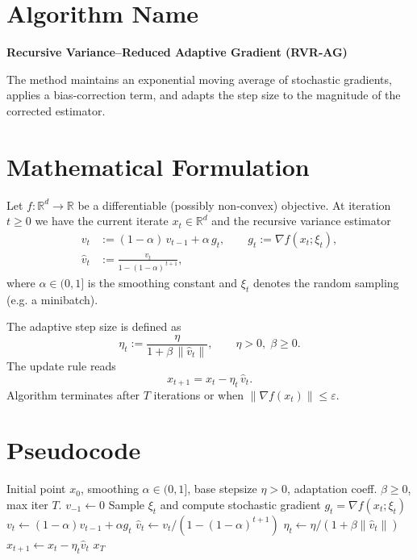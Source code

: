 \documentclass{article}
\newcommand{\norm}[1]{\left\|#1\right\|}
\newcommand{\grad}{\nabla}
\begin{document}
\section*{Algorithm Name}
\textbf{Recursive Variance–Reduced Adaptive Gradient (RVR‑AG)}  

The method maintains an exponential moving average of stochastic gradients, applies a bias‑correction term, and adapts the step size to the magnitude of the corrected estimator.

\section*{Mathematical Formulation}
Let $f:\mathbb{R}^d\rightarrow\mathbb{R}$ be a differentiable (possibly non‑convex) objective.  
At iteration $t\ge 0$ we have the current iterate $x_t\in\mathbb{R}^d$ and the recursive variance estimator
\begin{align}
    v_t &:= (1-\alpha)\,v_{t-1}+\alpha\,g_t,\qquad 
    g_t:=\grad f(x_t;\xi_t),\label{eq:vt}\\[4pt]
    \hat v_t &:= \frac{v_t}{1-(1-\alpha)^{\,t+1}},\tag{Bias correction}\label{eq:hatvt}
\end{align}
where $\alpha\in(0,1]$ is the smoothing constant and $\xi_t$ denotes the random sampling (e.g. a minibatch).  

The adaptive step size is defined as
\begin{equation}
    \eta_t := \frac{\eta}{1+\beta\,\norm{\hat v_t}},\qquad \eta>0,\;\beta\ge 0. \label{eq:et}
\end{equation}
The update rule reads
\begin{equation}
    x_{t+1}=x_t-\eta_t\,\hat v_t .\label{eq:update}
\end{equation}
Algorithm terminates after $T$ iterations or when $\norm{\grad f(x_t)}\le\varepsilon$.

\section*{Pseudocode}
\begin{algorithm}[H]
\caption{Recursive Variance‑Reduced Adaptive Gradient (RVR‑AG)}
\begin{algorithmic}[1]
\Require Initial point $x_0$, smoothing $\alpha\in(0,1]$, base stepsize $\eta>0$, 
        adaptation coeff. $\beta\ge0$, max iter $T$.
\State $v_{-1}\gets 0$ 
    \State Sample $\xi_t$ and compute stochastic gradient $g_t=\grad f(x_t;\xi_t)$
    \State $v_t \gets (1-\alpha)v_{t-1}+\alpha g_t$ 
    \State $\hat v_t \gets v_t/(1-(1-\alpha)^{t+1})$ 
    \State $\eta_t \gets \eta/(1+\beta\norm{\hat v_t})$ 
    \State $x_{t+1}\gets x_t-\eta_t\hat v_t$ 
\EndFor
\State \Return $x_T$
\end{algorithmic}
\end{algorithm}
\end{document}
